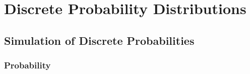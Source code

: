 \pagestyle{headings}
\setcounter{chapter}{0}
\chapter{Discrete Probability Distributions} \label{chp 1}
\setcounter{page}{1}

\section{Simulation of Discrete Probabilities} \label{sec 1.1}

\subsection*{Probability}

